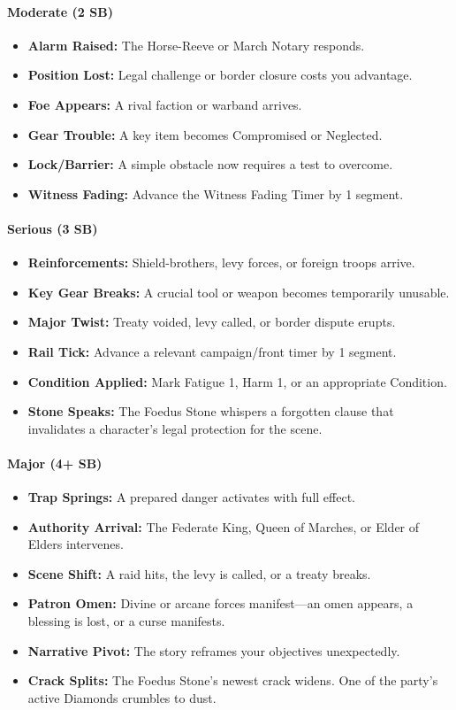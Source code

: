 \paragraph{Moderate (2 SB)}
\begin{itemize}[nosep]
  \item \textbf{Alarm Raised:} The Horse-Reeve or March Notary responds.
  \item \textbf{Position Lost:} Legal challenge or border closure costs you advantage.
  \item \textbf{Foe Appears:} A rival faction or warband arrives.
  \item \textbf{Gear Trouble:} A key item becomes Compromised or Neglected.
  \item \textbf{Lock/Barrier:} A simple obstacle now requires a test to overcome.
  \item \textbf{Witness Fading:} Advance the Witness Fading Timer by 1 segment.
\end{itemize}

\paragraph{Serious (3 SB)}
\begin{itemize}[nosep]
  \item \textbf{Reinforcements:} Shield-brothers, levy forces, or foreign troops arrive.
  \item \textbf{Key Gear Breaks:} A crucial tool or weapon becomes temporarily unusable.
  \item \textbf{Major Twist:} Treaty voided, levy called, or border dispute erupts.
  \item \textbf{Rail Tick:} Advance a relevant campaign/front timer by 1 segment.
  \item \textbf{Condition Applied:} Mark Fatigue 1, Harm 1, or an appropriate Condition.
  \item \textbf{Stone Speaks:} The Foedus Stone whispers a forgotten clause that invalidates a character's legal protection for the scene.
\end{itemize}

\paragraph{Major (4+ SB)}
\begin{itemize}[nosep]
  \item \textbf{Trap Springs:} A prepared danger activates with full effect.
  \item \textbf{Authority Arrival:} The Federate King, Queen of Marches, or Elder of Elders intervenes.
  \item \textbf{Scene Shift:} A raid hits, the levy is called, or a treaty breaks.
  \item \textbf{Patron Omen:} Divine or arcane forces manifest---an omen appears, a blessing is lost, or a curse manifests.
  \item \textbf{Narrative Pivot:} The story reframes your objectives unexpectedly.
  \item \textbf{Crack Splits:} The Foedus Stone's newest crack widens. One of the party's active Diamonds crumbles to dust.
\end{itemize}


